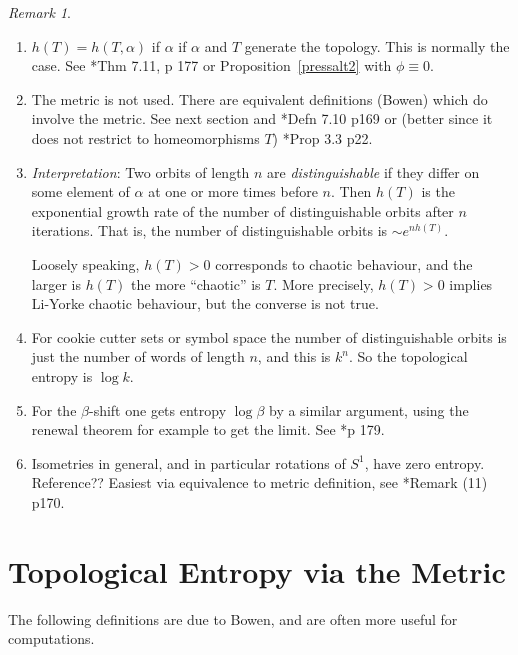 \documentclass[a4paper]{amsart}
\theoremstyle{plain}
\theoremstyle{definition}
\theoremstyle{remark}
\newtheorem{remark}[theorem]{Remark}
\begin{document}
\begin{remark} \label{rmte}        \mbox{}

\begin{enumerate}
  \item $h(T) =   h(T, \alpha) $  if $ \alpha $ if $ \alpha  $ and $ T $ generate the topology.  This is normally the case. See \cite{Wal}*{Thm 7.11, p 177} or   Proposition~\ref{pressalt2} with $ \phi \equiv 0 $. 

\item The metric is not used.  There are equivalent definitions (Bowen) which do involve the metric.  See  next section and \cite{Wal}*{Defn 7.10 p169} or (better since it does not restrict to homeomorphisms $ T $) \cite{PY}*{Prop 3.3 p22}.  

 
\item \emph{Interpretation}:  Two orbits of length $ n $ are \emph{distinguishable}   if they differ on some element of $ \alpha $  at one or more times before $ n $. Then 
$ h(T) $ is the exponential growth rate of the number of distinguishable orbits after $ n $ iterations.  That is, the number of distinguishable orbits is $ \sim e^{nh(T)} $. 

Loosely speaking, $ h(T)>0 $ corresponds to chaotic behaviour, and the larger is $ h(T)  $ the more ``chaotic'' is $ T $.  More precisely, $ h(T)>0 $ implies Li-Yorke chaotic behaviour, but the converse is not true.

\item \label{rmtec} For cookie cutter sets or symbol space the number of distinguishable orbits is just the number of words of length $ n $, and this is $ k^n $.  So the topological entropy is $ \log k $.

\item For the $ \beta $-shift one gets entropy $ \log \beta $  by a similar argument, using the renewal theorem for example to get the limit.   See \cite{Wal}*{p 179}. 

\item Isometries in general, and in particular rotations of $ S^1 $, have zero entropy.  Reference?? Easiest via equivalence to metric definition, see \cite{Wal}*{Remark (11) p170}.

\end{enumerate}


\end{remark}



\section{\textbf{Topological Entropy via the Metric}}
The following definitions are due to Bowen, and are often more useful for computations.
\end{document}
